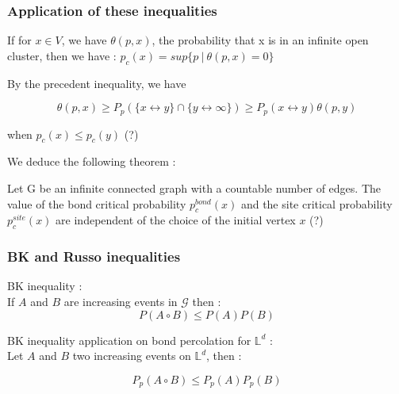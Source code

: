 \documentclass{article}
\begin{document}
\subsubsection{Application of these inequalities}

If for $x \in V$, we have $\theta(p, x)$, the probability that x is in an infinite open cluster, then we have :
$p_c(x)=sup\{p \ | \ \theta(p,x) = 0\}$

By the precedent inequality, we have

$$\theta(p, x) \geq P_p(\{x \longleftrightarrow y \} \cap \{y \longleftrightarrow \infty \}) \geq P_p(x \longleftrightarrow y)\theta(p, y)$$

when $p_c(x) \leq p_c(y)$ (?)

We deduce the following theorem :

Let G be an infinite connected graph with a countable number of edges. The value of the bond critical probability $p_c^{bond}(x)$ and the site critical probability $p_c^{site}(x)$ are independent of the choice of the initial vertex $x$ (?)

\subsubsection{BK and Russo inequalities}

BK inequality :\\

If $A$ and $B$ are increasing events in $\mathscr{G}$ then :
$$P(A \circ B) \leq P(A)P(B)$$

BK inequality application on bond percolation for $\mathbb{L}^d$ :\\
Let $A$ and $B$ two increasing events on $\mathbb{L}^d$, then :

$$P_p(A \circ B) \leq P_p(A)P_p(B)$$
\end{document}
